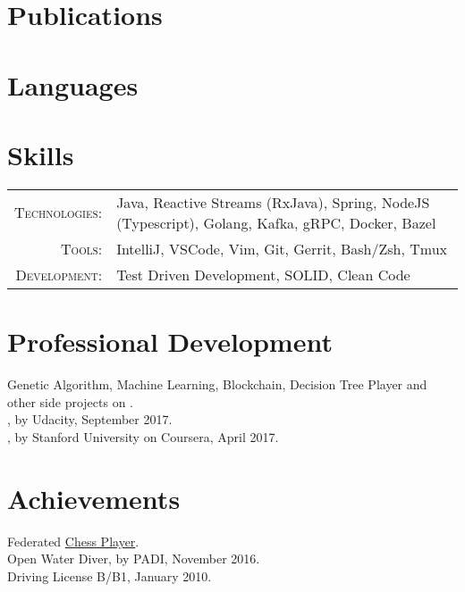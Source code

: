 \section{Publications}

\newpage

\section{Languages}

\section{Skills}
\begin{tabular}{r p{12.5cm}}
\textsc{Technologies:} & Java, Reactive Streams (RxJava), Spring, NodeJS (Typescript), Golang, Kafka, gRPC, Docker, Bazel\\
\textsc{Tools:} & IntelliJ, VSCode, Vim, Git, Gerrit, Bash/Zsh, Tmux\\
\textsc{Development:} & Test Driven Development, SOLID, Clean Code
\end{tabular}

\section{Professional Development}
\noindent
\bulletText Genetic Algorithm, Machine Learning, Blockchain, Decision Tree Player and other side projects on \gitHubNoUrl{}.\\
\bulletText \certificateFE{}, by Udacity, September 2017.\\
\bulletText \certificateML{}, by Stanford University on Coursera, April 2017. %

\section{Achievements}
\noindent
\bulletText Federated \href{http://ratings.fide.com/card.phtml?event=1958720}{Chess Player}.\\
\bulletText Open Water Diver, by PADI, November 2016.\\
\bulletText Driving License B/B1, January 2010.
